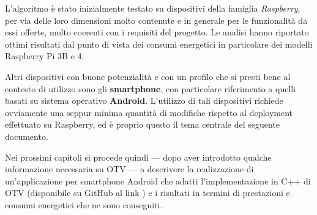 L'algoritmo è stato inizialmente testato su dispositivi della famiglia \textit{Raspberry}, per via delle loro dimensioni molto
contenute e in generale per le funzionalità da essi offerte, molto coerenti con i requisiti del progetto. Le analisi \cite{app11157027} 
hanno riportato ottimi risultati dal punto di vista dei consumi energetici in particolare dei modelli Raspberry Pi 3B e 4. 

Altri dispositivi con buone potenzialità e con un profilo che si presti bene al contesto di utilizzo sono gli \textbf{smartphone},
con particolare riferimento a quelli basati su sistema operativo \textbf{Android}. L'utilizzo di tali dispositivi richiede ovviamente
una seppur minima quantità di modifiche rispetto al deployment effettuato su Raspberry, ed è proprio questo il tema centrale
del seguente documento.

Nei prossimi capitoli si procede quindi --- dopo aver introdotto qualche informazione necessaria su OTV --- a descrivere 
la realizzazione di un'applicazione per smartphone Android che adatti l'implementazione in C++ di OTV (disponibile su GitHub al link 
\cite{otvgit}) e i risultati in termini di prestazioni e consumi energetici che ne sono conseguiti.




\clearpage{\pagestyle{empty}\cleardoublepage}